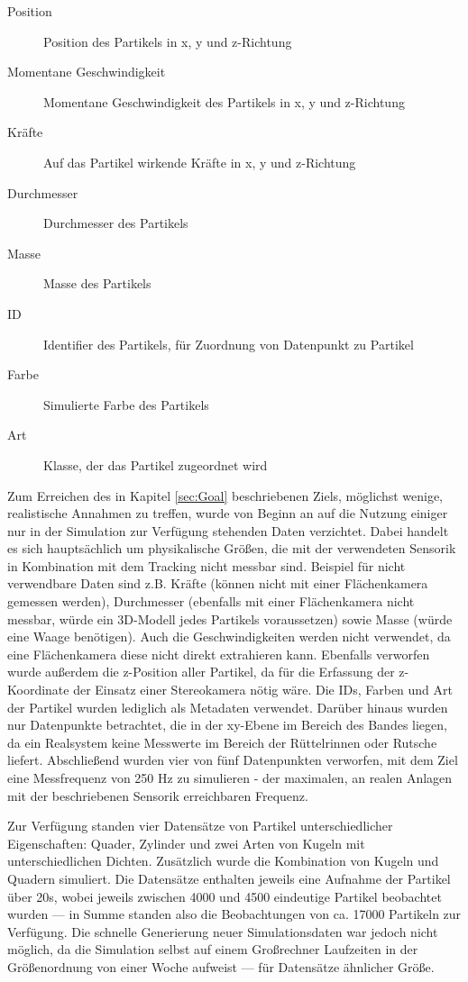 \begin{description}
\item[Position] Position des Partikels in x, y und z-Richtung
\item[Momentane Geschwindigkeit] Momentane Geschwindigkeit des Partikels in x, y und z-Richtung
\item[Kräfte] Auf das Partikel wirkende Kräfte in x, y und z-Richtung
\item[Durchmesser] Durchmesser des Partikels
\item[Masse] Masse des Partikels
\item[ID] Identifier des Partikels, für Zuordnung von Datenpunkt zu Partikel
\item[Farbe] Simulierte Farbe des Partikels
\item[Art] Klasse, der das Partikel zugeordnet wird
\end{description}

Zum Erreichen des in Kapitel \ref{sec:Goal} beschriebenen Ziels, möglichst wenige, realistische Annahmen zu treffen, wurde von Beginn an auf die Nutzung einiger nur in der Simulation zur Verfügung stehenden Daten verzichtet. Dabei handelt es sich hauptsächlich um physikalische Größen, die mit der verwendeten Sensorik in Kombination mit dem Tracking nicht messbar sind. Beispiel für nicht verwendbare Daten sind z.B. Kräfte (können nicht mit einer Flächenkamera gemessen werden), Durchmesser (ebenfalls mit einer Flächenkamera nicht messbar, würde ein 3D-Modell jedes Partikels voraussetzen) sowie Masse (würde eine Waage benötigen). Auch die Geschwindigkeiten werden nicht verwendet, da eine Flächenkamera diese nicht direkt extrahieren kann. Ebenfalls verworfen wurde außerdem die z-Position aller Partikel, da für die Erfassung der z-Koordinate der Einsatz einer Stereokamera nötig wäre. Die IDs, Farben und Art der Partikel wurden lediglich als Metadaten verwendet. Darüber hinaus wurden nur Datenpunkte betrachtet, die in der xy-Ebene im Bereich des Bandes liegen, da ein Realsystem keine Messwerte im Bereich der Rüttelrinnen oder Rutsche liefert. Abschließend wurden vier von fünf Datenpunkten verworfen, mit dem Ziel eine Messfrequenz von 250 Hz zu simulieren - der maximalen, an realen Anlagen mit der beschriebenen Sensorik erreichbaren Frequenz.

Zur Verfügung standen vier Datensätze von Partikel unterschiedlicher Eigenschaften: Quader, Zylinder und zwei Arten von Kugeln mit unterschiedlichen Dichten. Zusätzlich wurde die Kombination von Kugeln und Quadern simuliert. Die Datensätze enthalten jeweils eine Aufnahme der Partikel über 20s, wobei jeweils zwischen 4000 und 4500 eindeutige Partikel beobachtet wurden --- in Summe standen also die Beobachtungen von ca. 17000 Partikeln zur Verfügung. Die schnelle Generierung neuer Simulationsdaten war jedoch nicht möglich, da die Simulation selbst auf einem Großrechner Laufzeiten in der Größenordnung von einer Woche aufweist --- für Datensätze ähnlicher Größe. %

